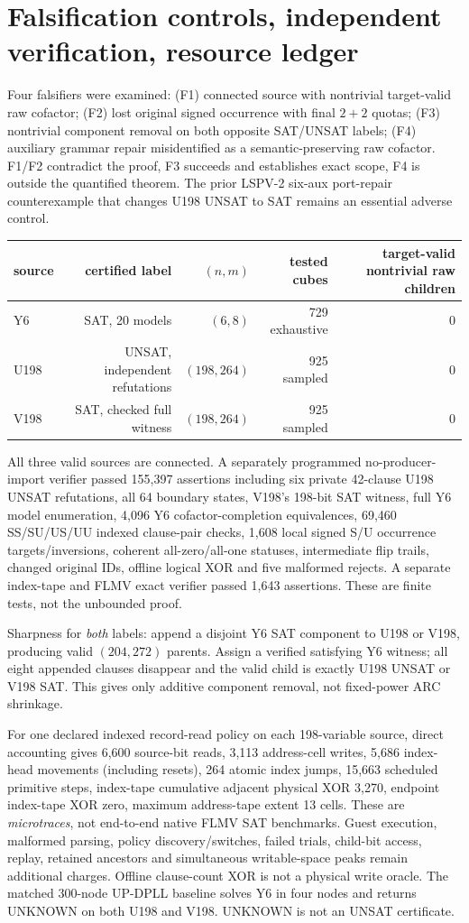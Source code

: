 \documentclass[10pt]{article}
\begin{document}
\section{Falsification controls, independent verification, resource ledger}
Four falsifiers were examined: (F1) connected source with nontrivial target-valid raw cofactor; (F2) lost original signed occurrence with final $2+2$ quotas; (F3) nontrivial component removal on both opposite SAT/UNSAT labels; (F4) auxiliary grammar repair misidentified as a semantic-preserving raw cofactor. F1/F2 contradict the proof, F3 succeeds and establishes exact scope, F4 is outside the quantified theorem. The prior LSPV-2 six-aux port-repair counterexample that changes U198 UNSAT to SAT remains an essential adverse control.
\begin{center}\begin{tabular}{lrrrr}
\toprule source & certified label & $(n,m)$ & tested cubes & target-valid nontrivial raw children\\\midrule
Y6 & SAT, 20 models & $(6,8)$ & 729 exhaustive & 0\\
U198 & UNSAT, independent refutations & $(198,264)$ & 925 sampled & 0\\
V198 & SAT, checked full witness & $(198,264)$ & 925 sampled & 0\\\bottomrule
\end{tabular}\end{center}
All three valid sources are connected. A separately programmed no-producer-import verifier passed 155,397 assertions including six private 42-clause U198 UNSAT refutations, all 64 boundary states, V198's 198-bit SAT witness, full Y6 model enumeration, 4,096 Y6 cofactor-completion equivalences, 69,460 SS/SU/US/UU indexed clause-pair checks, 1,608 local signed S/U occurrence targets/inversions, coherent all-zero/all-one statuses, intermediate flip trails, changed original IDs, offline logical XOR and five malformed rejects. A separate index-tape and FLMV exact verifier passed 1,643 assertions. These are finite tests, not the unbounded proof.
\par\noindent Sharpness for \emph{both} labels: append a disjoint Y6 SAT component to U198 or V198, producing valid $(204,272)$ parents. Assign a verified satisfying Y6 witness; all eight appended clauses disappear and the valid child is exactly U198 UNSAT or V198 SAT. This gives only additive component removal, not fixed-power ARC shrinkage.
\par\noindent For one declared indexed record-read policy on each 198-variable source, direct accounting gives 6,600 source-bit reads, 3,113 address-cell writes, 5,686 index-head movements (including resets), 264 atomic index jumps, 15,663 scheduled primitive steps, index-tape cumulative adjacent physical XOR 3,270, endpoint index-tape XOR zero, maximum address-tape extent 13 cells. These are \emph{microtraces}, not end-to-end native FLMV SAT benchmarks. Guest execution, malformed parsing, policy discovery/switches, failed trials, child-bit access, replay, retained ancestors and simultaneous writable-space peaks remain additional charges. Offline clause-count XOR is not a physical write oracle. The matched 300-node UP-DPLL baseline solves Y6 in four nodes and returns UNKNOWN on both U198 and V198. UNKNOWN is not an UNSAT certificate.
\end{document}
